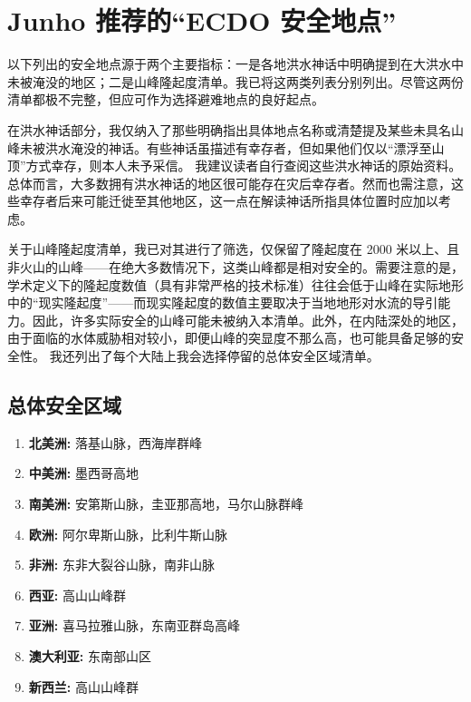 \documentclass[10pt,twocolumn,letterpaper]{article}
\begin{document}
\section{Junho 推荐的“ECDO 安全地点”}
以下列出的安全地点源于两个主要指标：一是各地洪水神话中明确提到在大洪水中未被淹没的地区；二是山峰隆起度清单。我已将这两类列表分别列出。尽管这两份清单都极不完整，但应可作为选择避难地点的良好起点。

在洪水神话部分，我仅纳入了那些明确指出具体地点名称或清楚提及某些未具名山峰未被洪水淹没的神话。有些神话虽描述有幸存者，但如果他们仅以“漂浮至山顶”方式幸存，则本人未予采信。 我建议读者自行查阅这些洪水神话的原始资料。总体而言，大多数拥有洪水神话的地区很可能存在灾后幸存者。然而也需注意，这些幸存者后来可能迁徙至其他地区，这一点在解读神话所指具体位置时应加以考虑。

关于山峰隆起度清单，我已对其进行了筛选，仅保留了隆起度在 2000 米以上、且非火山的山峰——在绝大多数情况下，这类山峰都是相对安全的。需要注意的是，学术定义下的隆起度数值（具有非常严格的技术标准）往往会低于山峰在实际地形中的“现实隆起度”——而现实隆起度的数值主要取决于当地地形对水流的导引能力。因此，许多实际安全的山峰可能未被纳入本清单。此外，在内陆深处的地区，由于面临的水体威胁相对较小，即便山峰的突显度不那么高，也可能具备足够的安全性。
我还列出了每个大陆上我会选择停留的总体安全区域清单。

\subsection{总体安全区域}
\begin{flushleft}
\begin{enumerate}
    \item \textbf{北美洲:} 落基山脉，西海岸群峰
    \item \textbf{中美洲:} 墨西哥高地
    \item \textbf{南美洲:} 安第斯山脉，圭亚那高地，马尔山脉群峰
    \item \textbf{欧洲:} 阿尔卑斯山脉，比利牛斯山脉
    \item \textbf{非洲:} 东非大裂谷山脉，南非山脉
    \item \textbf{西亚:} 高山山峰群
    \item \textbf{亚洲:} 喜马拉雅山脉，东南亚群岛高峰
    \item \textbf{澳大利亚:} 东南部山区
    \item \textbf{新西兰:} 高山山峰群
\end{enumerate}
\end{flushleft}

\clearpage
\twocolumn
\end{document}
